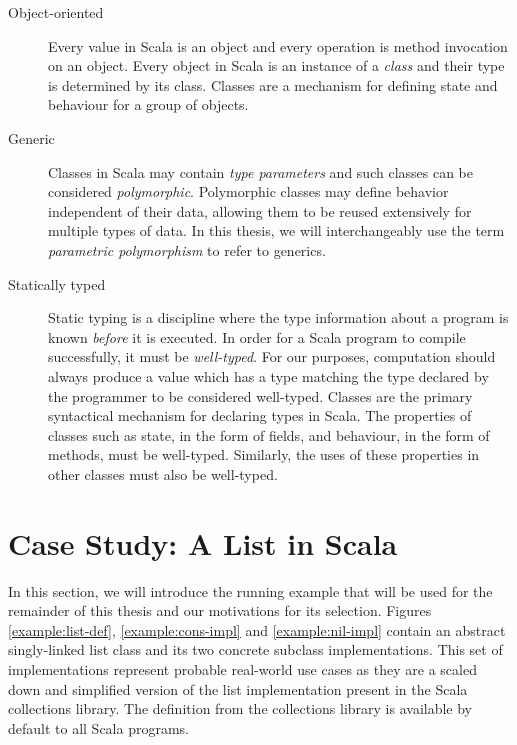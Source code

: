 \begin{description}
	\item[Object-oriented] 
	Every value in Scala is an object and every operation is method invocation on an object. 
	Every object in Scala is an instance of a \textit{class} and their type is determined by its class.
	Classes\cite{simula:classes} are a mechanism for defining state and behaviour for a group of objects.	
	
	\item[Generic] 
	Classes in Scala may contain \textit{type parameters} and such classes can be considered \textit{polymorphic}\cite{strachey:fundamental-concepts}.
	Polymorphic classes may define behavior independent of their data, allowing them to be reused extensively for multiple types of data.
	In this thesis, we will interchangeably use the term \textit{parametric polymorphism} to refer to generics.
	
	\item[Statically typed] 
	Static typing is a discipline where the type information about a program is known \textit{before} it is executed.
	In order for a Scala program to compile successfully, it must be \textit{well-typed}.
	For our purposes, computation should always produce a value which has a type matching the type declared by the programmer to be considered well-typed.
	Classes are the primary syntactical mechanism for declaring types in Scala. 
	The properties of classes such as state, in the form of fields, and behaviour, in the form of methods, must be well-typed.
	Similarly, the uses of these properties in other classes must also be well-typed. 
\end{description}

\section{Case Study: A List in Scala}

In this section, we will introduce the running example that will be used for the remainder of this thesis and our motivations for its selection.
Figures \ref{example:list-def}, \ref{example:cons-impl} and \ref{example:nil-impl} contain an abstract singly-linked list class and its two concrete subclass implementations. 
This set of  implementations represent probable real-world use cases as they are a scaled down and simplified version of the list implementation present in the Scala collections library.
The  definition from the collections library is available by default to all Scala programs.

